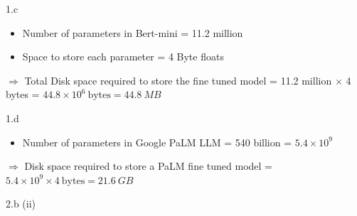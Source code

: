 \LARGE
1.c
\normalsize

\begin{answer}
    \begin{itemize}
        \item Number of parameters in Bert-mini = 11.2 million
        \item Space to store each parameter = 4 Byte floats
    \end{itemize}

    $\Rightarrow$ Total Disk space required to store the fine tuned model = 11.2 million $\times$ 4 bytes = $44.8 \times 10^{6}~\text{bytes} = 44.8~MB$
    
\end{answer}

\LARGE
1.d
\normalsize

\begin{answer}
    \begin{itemize}
    \item Number of parameters in Google PaLM LLM = 540 billion = $5.4 \times 10^{9}$
    \end{itemize}

    $\Rightarrow$ Disk space required to store a PaLM fine tuned model = $5.4 \times 10^{9} \times 4~\text{bytes} = 21.6~GB$
    
\end{answer}

\clearpage

\LARGE
2.b (ii)
\normalsize

